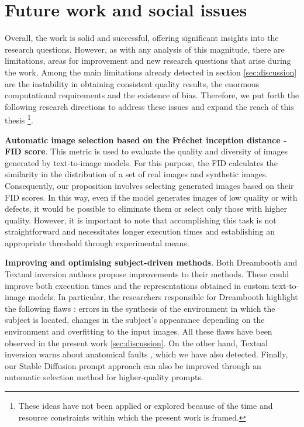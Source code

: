 \chapter{Future work and social issues} \label{sec:future}

Overall, the work is solid and successful, offering significant insights into the research questions. However, as with any analysis of this magnitude, there are limitations, areas for improvement and new research questions that arise during the work. Among the main limitations already detected in section \ref{sec:discussion} are the instability in obtaining consistent quality results, the enormous computational requirements and the existence of bias. Therefore, we put forth the following research directions to address these issues and expand the reach of this thesis \footnote{These ideas have not been applied or explored because of the time and resource constraints within which the present work is framed.}.

\textbf{Automatic image selection based on the Fréchet inception distance - FID score}. This metric is used to evaluate the quality and diversity of images generated by text-to-image models. For this purpose, the FID calculates the similarity in the distribution of a set of real images and synthetic images. Consequently, our proposition involves selecting generated images based on their FID scores. In this way, even if the model generates images of low quality or with defects, it would be possible to eliminate them or select only those with higher quality. However, it is important to note that accomplishing this task is not straightforward and necessitates longer execution times and establishing an appropriate threshold through experimental means.

\textbf{Improving and optimising subject-driven methods}. Both Dreambooth and Textual inversion authors propose improvements to their methods. These could improve both execution times and the representations obtained in custom text-to-image models. In particular, the researchers responsible for Dreambooth highlight the following flaws \cite{ruiz2023dreambooth}: errors in the synthesis of the environment in which the subject is located, changes in the subject's appearance depending on the environment and overfitting to the input images. All these flaws have been observed in the present work \ref{sec:discussion}. On the other hand, Textual inversion warns about anatomical faults \cite{gal2022image}, which we have also detected. Finally, our Stable Diffusion prompt approach can also be improved through an automatic selection method for higher-quality prompts.


